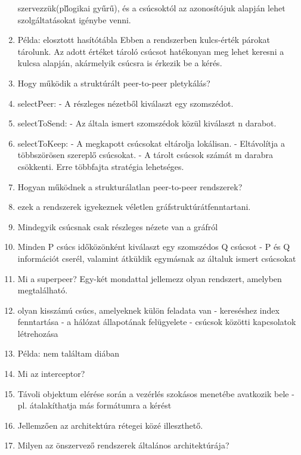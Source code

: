 \documentclass[twoside, a4paper, 12pt]{article}
\begin{document}
\begin{enumerate}
                szervezzük(pl\. logikai gyűrű),
                és a csúcsoktól az azonosítójuk alapján lehet szolgáltatásokat igénybe venni.
            \item Példa: elosztott hasítótábla Ebben a rendszerben kulcs-érték párokat tárolunk.
                Az adott értéket tároló csúcsot hatékonyan meg lehet keresni a kulcsa alapján, akármelyik csúcsra
                is érkezik be a kérés.
            \item Hogy működik a struktúrált peer-to-peer pletykálás?
            \item selectPeer:
                - A részleges nézetből kiválaszt egy szomszédot.
            \item selectToSend: 
                - Az általa ismert szomszédok közül kiválaszt n darabot.
            \item selectToKeep:
                - A megkapott csúcsokat eltárolja lokálisan.
                - Eltávolítja a többszörösen szereplő csúcsokat.
                - A tárolt csúcsok számát m darabra csökkenti. Erre többfajta stratégia lehetséges.
            \item Hogyan működnek a strukturálatlan peer-to-peer rendszerek?
            \item ezek a rendszerek igyekeznek véletlen gráfstruktúrátfenntartani.
            \item Mindegyik csúcsnak csak részleges nézete van a gráfról 
            \item Minden P csúcs időközönként kiválaszt egy szomszédos Q csúcsot
                - P és Q információt cserél, valamint átküldik egymásnak az általuk ismert csúcsokat
            \item  Mi a superpeer? Egy-két mondattal jellemezz olyan rendszert, amelyben megtalálható.
            \item olyan kisszámú csúcs, amelyeknek külön feladata van
                - kereséshez index fenntartása
                - a hálózat állapotának felügyelete
                - csúcsok közötti kapcsolatok létrehozása
            \item Példa: nem találtam diában
            \item  Mi az interceptor?
            \item Távoli objektum elérése során a vezérlés szokásos menetébe avatkozik bele
                - pl. átalakíthatja más formátumra a kérést
            \item Jellemzően az architektúra rétegei közé illeszthető.
            \item  Milyen az önszervező rendszerek általános architektúrája?

\end{enumerate}
\end{document}
